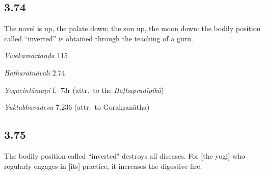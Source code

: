 \begin{ekdosis}
\subsection*{3.74}
\begin{translation}[hp03_074]
The navel is up, the palate down; the sun up, the moon down: the bodily position called “inverted” is obtained through the teaching of a guru.
\end{translation}
% 

\begin{sources}[hp03_074]
\emph{Vivekamārtaṇḍa} 115
\begin{versinnote}
\end{versinnote}
\end{sources}

\begin{testimonia}[hp03_074]
\emph{Haṭharatnāvalī} 2.74
\begin{versinnote}
\end{versinnote}

\emph{Yogacintāmaṇi} f.~73r (attr.~to the \emph{Haṭhapradīpikā})
\begin{versinnote}
\end{versinnote}

\emph{Yuktabhavadeva} 7.236 (attr.~to Gorakṣanātha)
\begin{versinnote}
\end{versinnote}
\end{testimonia}



\subsection*{3.75}
\begin{translation}[hp03_075]
The bodily position called “inverted" destroys all diseases. For [the yogi] who regularly engages in [its] practice, it increases the digestive fire.
\end{translation}


\end{ekdosis}

